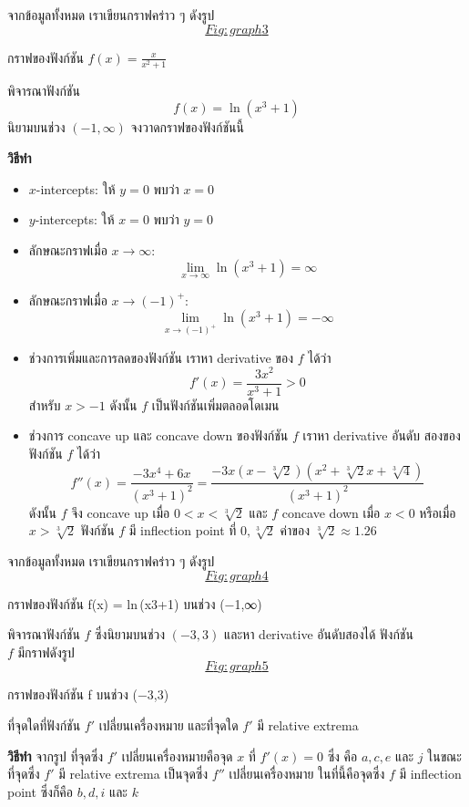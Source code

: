 \documentclass[
]{book}
\begin{document}
จากข้อมูลทั้งหมด เราเขียนกราฟคร่าว ๆ
ดังรูป~\hyperref[Fig:graph3]{\[Fig:graph3\]}

กราฟของฟังก์ชัน {\(f(x) =
\frac{x}{x^2+1}\)}

พิจารณาฟังก์ชัน \[f(x) = \ln(x^3+1)\] นิยามบนช่วง \((-1,\infty)\)
จงวาดกราฟของฟังก์ชันนี้

\textbf{วิธีทำ}

\begin{itemize}
\item
  \(x\)-intercepts: ให้ \(y=0\) พบว่า \(x=0\)
\item
  \(y\)-intercepts: ให้ \(x=0\) พบว่า \(y=0\)
\item
  ลักษณะกราฟเมื่อ \(x \to \infty\):
  \[\lim_{x\to\infty} \ln(x^3+1) = \infty\]
\item
  ลักษณะกราฟเมื่อ \(x\to (-1)^+\):
  \[\lim_{x\to (-1)^+} \ln(x^3+1) = -\infty\]
\item
  ช่วงการเพิ่มและการลดของฟังก์ชัน เราหา derivative ของ \(f\) ได้ว่า
  \[f'(x) = \frac{3x^2}{x^3+1} > 0\] สำหรับ \(x>-1\) ดังนั้น \(f\)
  เป็นฟังก์ชันเพิ่มตลอดโดเมน
\item
  ช่วงการ concave up และ concave down ของฟังก์ชัน \(f\) เราหา derivative
  อันดับ สองของฟังก์ชัน \(f\) ได้ว่า
  \[f''(x) = \frac{-3x^4+6x}{(x^3+1)^2} = \frac{-3x(x-\sqrt[3]{2})(x^2+\sqrt[3]{2}x+\sqrt[3]{4})}{(x^3+1)^2}\]
  ดังนั้น \(f\) จึง concave up เมื่อ \(0<x<\sqrt[3]{2}\) และ \(f\) concave
  down เมื่อ \(x<0\) หรือเมื่อ \(x>\sqrt[3]{2}\) ฟังก์ชัน \(f\) มี inflection
  point ที่ \(0,\sqrt[3]{2}\) ค่าของ \(\sqrt[3]{2} \approx 1.26\)
\end{itemize}

จากข้อมูลทั้งหมด เราเขียนกราฟคร่าว ๆ
ดังรูป~\hyperref[Fig:graph4]{\[Fig:graph4\]}

กราฟของฟังก์ชัน {f(x) = ln (x3+1)} บนช่วง {(−1,∞)}

พิจารณาฟังก์ชัน \(f\) ซึ่งนิยามบนช่วง \((-3,3)\) และหา derivative อันดับสองได้
ฟังก์ชัน\\
\(f\) มีกราฟดังรูป~\hyperref[Fig:graph5]{\[Fig:graph5\]}

กราฟของฟังก์ชัน {f} บนช่วง {(−3,3)}

ที่จุดใดที่ฟังก์ชัน \(f'\) เปลี่ยนเครื่องหมาย และที่จุดใด \(f'\) มี relative extrema

\textbf{วิธีทำ} จากรูป ที่จุดซึ่ง \(f'\) เปลี่ยนเครื่องหมายคือจุด \(x\) ที่
\(f'(x) = 0\) ซึ่ง คือ \(a, c, e\) และ \(j\) ในขณะที่จุดซึ่ง \(f'\) มี relative
extrema เป็นจุดซึ่ง \(f''\) เปลี่ยนเครื่องหมาย ในที่นี้คือจุดซึ่ง \(f\) มี inflection
point ซึ่งก็คือ \(b, d, i\) และ \(k\)
\end{document}
